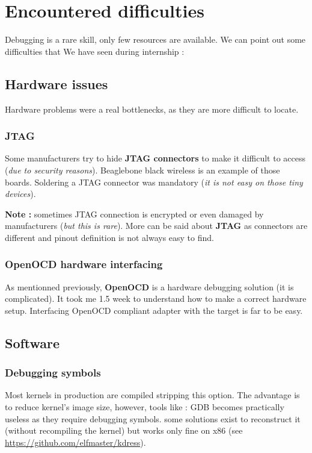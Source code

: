 \section{Encountered difficulties}
Debugging is a rare skill, only few resources are available. We can point out some difficulties that We have seen during internship :

\subsection{Hardware issues}
Hardware problems were a real bottlenecks, as they are more difficult to locate.
\subsubsection{JTAG}
Some manufacturers try to hide \textbf{JTAG connectors} to make it difficult to access (\textit{due to security reasons}). Beaglebone black wireless is an example of those boards. Soldering a JTAG connector was mandatory (\textit{it is not easy on those tiny devices}).

\textbf{\color{orange}Note : } sometimes JTAG connection is encrypted or even damaged by manufacturers (\textit{but this is rare}). 
More can be said about \textbf{JTAG} as connectors are different and pinout definition is not always easy to find.
\subsubsection{OpenOCD hardware interfacing}
As mentionned previously, \textbf{OpenOCD} is a hardware debugging solution (it is complicated). It took me 1.5 week to understand how to make a correct hardware setup. Interfacing OpenOCD compliant adapter with the target is far to be easy.

\subsection{Software}

\subsubsection{Debugging symbols}
Most kernels in production are compiled stripping this option. The advantage is to reduce kernel's image size, however, tools like : GDB becomes practically useless as they require debugging symbols. some solutions exist to reconstruct it (without recompiling the kernel) but works only fine on x86 (see {\color{blue}\url{https://github.com/elfmaster/kdress}}).

